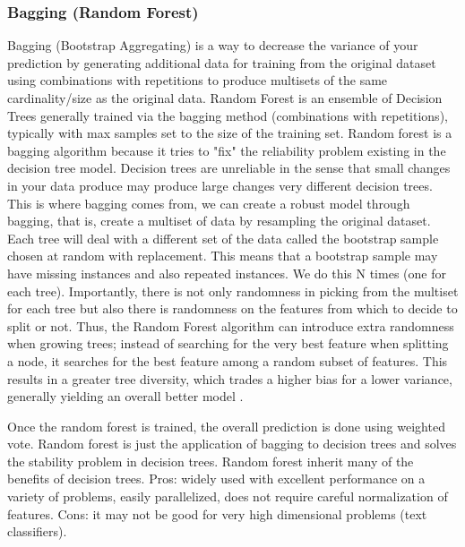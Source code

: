\documentclass[11pt]{article}
\theoremstyle{definition}
\theoremstyle{remark}
\begin{document}
\subsubsection{Bagging (Random Forest)}
\label{sse:rf}
Bagging (Bootstrap Aggregating) is a way to decrease the variance of your prediction by generating additional data for training from the  original dataset using combinations with repetitions to produce multisets of the same cardinality/size as the original data.
Random Forest is an ensemble of Decision Trees generally trained via the bagging method (combinations with repetitions), typically with max samples set to the size of the training set.
Random forest is a bagging algorithm because it tries to "fix" the reliability problem existing in the decision tree model. Decision trees are unreliable in the sense that small changes in your data produce may produce large changes very different decision trees. This is where bagging comes from, we can create a robust model through bagging, that is, create a multiset of data by resampling the original dataset. Each tree will deal with a different set of the data called the bootstrap sample chosen at random with replacement. This means that a bootstrap sample may have missing instances and also repeated instances. We do this N times (one for each tree). Importantly, there is not only randomness in picking from the multiset for each tree but also there is randomness on the features from which to decide to split or not.  
Thus, the Random Forest algorithm can introduce extra randomness when growing trees; instead of searching for the very best feature when splitting a node, it searches for the best feature among a random subset of features. This results in a greater tree diversity, which trades a higher bias for a lower variance, generally yielding an overall better model \cite{geron2017hands}. 

Once the random forest is trained, the overall prediction is done using weighted vote. Random forest is just the application of bagging to decision trees and solves the stability problem in decision trees. Random forest inherit many of the benefits of decision trees. Pros: widely used with excellent performance on a variety of problems, easily parallelized, does not require careful normalization of features. Cons: it may not be good for very high dimensional problems (text classifiers). 
\end{document}
